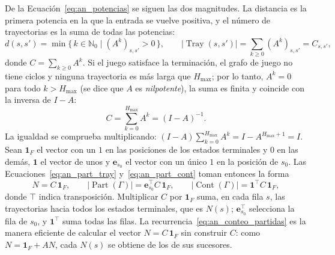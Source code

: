 De la Ecuación~\eqref{eq:an_potencias} se siguen las dos magnitudes. La distancia es la primera potencia en la que la entrada se vuelve positiva, y el número de trayectorias es la suma de todas las potencias:
\begin{equation}
    d(s, s') = \min\{\, k \in \mathbb N_0 \mid (A^k)_{s,s'} > 0 \,\},
    \qquad
    |\operatorname{Tray}(s, s')| = \sum_{k \ge 0} (A^k)_{s,s'} = C_{s,s'},
    \label{eq:an_distancia_conteo}
\end{equation}
donde $C = \sum_{k \ge 0} A^k$. Si el juego satisface la terminación, el grafo de juego no tiene ciclos y ninguna trayectoria es más larga que $H_{\max}$; por lo tanto, $A^k = 0$ para todo $k > H_{\max}$ (se dice que $A$ es \emph{nilpotente}), la suma es finita y coincide con la inversa de $I - A$:
\begin{equation}
    C = \sum_{k=0}^{H_{\max}} A^k = (I - A)^{-1}.
    \label{eq:an_matriz_conteo}
\end{equation}
La igualdad se comprueba multiplicando: $(I - A) \sum_{k=0}^{H_{\max}} A^k = I - A^{H_{\max}+1} = I$. Sean $\mathbf 1_F$ el vector con un $1$ en las posiciones de los estados terminales y $0$ en las demás, $\mathbf 1$ el vector de unos y $\mathbf e_{s_0}$ el vector con un único $1$ en la posición de $s_0$. Las Ecuaciones~\eqref{eq:an_part_tray} y~\eqref{eq:an_part_cont} toman entonces la forma
\begin{equation}
    N = C\, \mathbf 1_F,
    \qquad
    |\operatorname{Part}(\Gamma)| = \mathbf e_{s_0}^{\top} C\, \mathbf 1_F,
    \qquad
    |\operatorname{Cont}(\Gamma)| = \mathbf 1^{\top} C\, \mathbf 1_F,
    \label{eq:an_conteo_matricial}
\end{equation}
donde $\top$ indica transposición. Multiplicar $C$ por $\mathbf 1_F$ suma, en cada fila $s$, las trayectorias hacia todos los estados terminales, que es $N(s)$; $\mathbf e_{s_0}^{\top}$ selecciona la fila de $s_0$, y $\mathbf 1^{\top}$ suma todas las filas. La recurrencia~\eqref{eq:an_conteo_partidas} es la manera eficiente de calcular el vector $N = C\,\mathbf 1_F$ sin construir $C$: como $N = \mathbf 1_F + A N$, cada $N(s)$ se obtiene de los de sus sucesores.

